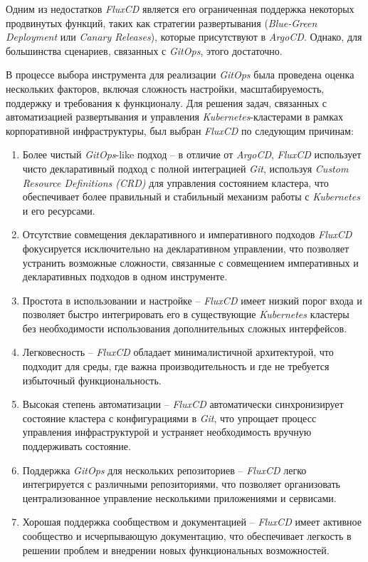 Одним из недостатков \textit{FluxCD} является его ограниченная поддержка некоторых продвинутых функций, таких как стратегии развертывания (\textit{Blue-Green Deployment} или \textit{Canary Releases}), которые присутствуют в \textit{ArgoCD}. Однако, для большинства сценариев, связанных с \textit{GitOps}, этого достаточно.

В процессе выбора инструмента для реализации \textit{GitOps} была проведена оценка нескольких факторов, включая сложность настройки, масштабируемость, поддержку и требования к функционалу. Для решения задач, связанных с автоматизацией развертывания и управления \textit{Kubernetes}-кластерами в рамках корпоративной инфраструктуры, был выбран \textit{FluxCD} по следующим причинам:

\begin{enumerate}
    \item Более чистый \textit{GitOps}-like подход -- в отличие от \textit{ArgoCD}, \textit{FluxCD} использует чисто декларативный подход с полной интеграцией \textit{Git}, используя \textit{Custom Resource Definitions (CRD)} для управления состоянием кластера, что обеспечивает более правильный и стабильный механизм работы с \textit{Kubernetes} и его ресурсами.
    \item Отсутствие совмещения декларативного и императивного подходов \textit{FluxCD} фокусируется исключительно на декларативном управлении, что позволяет устранить возможные сложности, связанные с совмещением императивных и декларативных подходов в одном инструменте.
    \item Простота в использовании и настройке -- \textit{FluxCD} имеет низкий порог входа и позволяет быстро интегрировать его в существующие \textit{Kubernetes} кластеры без необходимости использования дополнительных сложных интерфейсов.
    \item Легковесность -- \textit{FluxCD} обладает минималистичной архитектурой, что подходит для среды, где важна производительность и где не требуется избыточный функциональность.
    \item Высокая степень автоматизации -- \textit{FluxCD} автоматически синхронизирует состояние кластера с конфигурациями в \textit{Git}, что упрощает процесс управления инфраструктурой и устраняет необходимость вручную поддерживать состояние.
    \item Поддержка \textit{GitOps} для нескольких репозиториев -- \textit{FluxCD} легко интегрируется с различными репозиториями, что позволяет организовать централизованное управление несколькими приложениями и сервисами.
    \item Хорошая поддержка сообществом и документацией -- \textit{FluxCD} имеет активное сообщество и исчерпывающую документацию, что обеспечивает легкость в решении проблем и внедрении новых функциональных возможностей. 
\end{enumerate}

